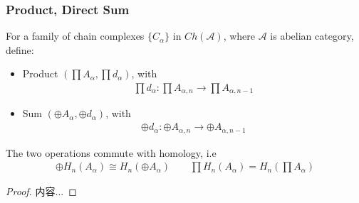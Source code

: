 \documentclass[Total.tex]{subfiles}
\begin{document}
				\subsubsection{Product, Direct Sum}
					\begin{Def}
						For a family of chain complexes $\{C_\alpha\}$ in $Ch(\mathcal{A})$, where $\mathcal{A}$ is abelian category, define:
						\begin{itemize}
							\item Product $(\prod A_\alpha,\prod d_\alpha)$, with
							\begin{gather*}
								\prod d_\alpha:\prod A_{\alpha,n}\rightarrow \prod A_{\alpha,n-1} 
							\end{gather*}
							\item Sum $(\oplus A_\alpha,\oplus d_\alpha)$, with	
							\begin{gather*}
								\oplus d_\alpha:\oplus A_{\alpha,n}\rightarrow \oplus A_{\alpha,n-1}
							\end{gather*}
						\end{itemize}
					\end{Def}
					\begin{proposition}
						The two operations commute with homology, i.e
						\begin{gather*}
							\oplus H_n(A_\alpha)\cong H_n(\oplus A_\alpha)\qquad \prod H_n(A_\alpha)=H_n(\prod A_\alpha)
						\end{gather*}
					\end{proposition}
					\begin{proof}
						内容...
					\end{proof}
\end{document}
